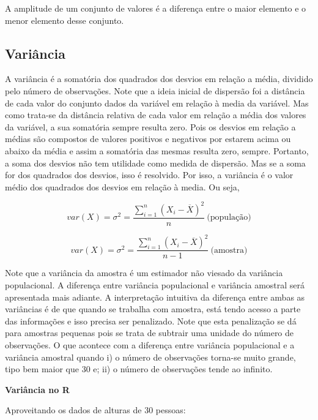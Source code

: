 \documentclass[
]{book}
\begin{document}
A amplitude de um conjunto de valores é a diferença entre o maior elemento e o menor elemento desse conjunto.

\hypertarget{variuxe2ncia}{%
\subsection{Variância}\label{variuxe2ncia}}

A variância é a somatória dos quadrados dos desvios em relação a média, dividido pelo número de observações. Note que a ideia inicial de dispersão foi a distância de cada valor do conjunto dados da variável em relação à media da variável. Mas como trata-se da distância relativa de cada valor em relação a média dos valores da variável, a sua somatória sempre resulta zero. Pois os desvios em relação a médias são compostos de valores positivos e negativos por estarem acima ou abaixo da média e assim a somatória das mesmas resulta zero, sempre. Portanto, a soma dos desvios não tem utilidade como medida de dispersão. Mas se a soma for dos quadrados dos desvios, isso é resolvido. Por isso, a variância é o valor médio dos quadrados dos desvios em relação à media. Ou seja,

\begin{equation*}
  var(X) =\sigma^2 = \frac{\sum_{i=1}^{n}(X_i - \overline{X})^2}{n}~\text{(população)}
\end{equation*}

\begin{equation*}
  var(X) =\sigma^2 = \frac{\sum_{i=1}^{n}(X_i - \overline{X})^2}{n-1}~\text{(amostra)}
\end{equation*}

Note que a variância da amostra é um estimador não viesado da variância populacional. A diferença entre variância populacional e variância amostral será apresentada mais adiante. A interpretação intuitiva da diferença entre ambas as variâncias é de que quando se trabalha com amostra, está tendo acesso a parte das informações e isso precisa ser penalizado. Note que esta penalização se dá para amostras pequenas pois se trata de subtrair uma unidade do número de observações.
O que acontece com a diferença entre variância populacional e a variância amostral quando i) o número de observações torna-se muito grande, tipo bem maior que 30 e; ii) o número de observações tende ao infinito.

\textbf{Variância no R}

Aproveitando os dados de alturas de 30 pessoas:
\end{document}
